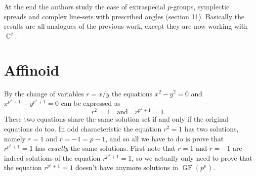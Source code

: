 \documentclass[a4paper]{article}
\DeclareMathOperator{\C}{\mathbb{C}}
\DeclareMathOperator{\GF}{GF}
\begin{document}
  At the end the authors study the case of extraspecial
  $p$-groups, symplectic spreads and complex line-sets with
  prescribed angles (section 11). Basically the results are
  all analogues of the previous work, except they are now
  working with $\C^{q}$. 

  \section{Affinoid}





  By the change of variables $r = x / y$ the equations
  $x^2-y^2 = 0$ and $x^{p^{s}+1} - y^{p^{s}+1} = 0$ can be
  expressed as
  \begin{equation}
    r^2 = 1
    \quad
    \text{and}
    \quad
    r^{p^{s}+1} = 1.
  \end{equation} 
  These two equations share the same solution set if and
  only if the original equations do too. In odd
  characteristic the equation $r^2 = 1$ has two solutions,
  namely $r = 1$ and $r = -1 = p - 1$, and so all we have to
  do is prove that $r^{p^{s}+1} = 1$ has \textit{exactly}
  the same solutions.  First note that $r = 1$ and $r = -1$
  are indeed solutions of the equation $r^{p^{s}+1} = 1$, so
  we actually only need to prove that the equation
  $r^{p^{s}+1} = 1$ doesn't have anymore solutions in
  $\GF(p^{n})$. 
\end{document}
